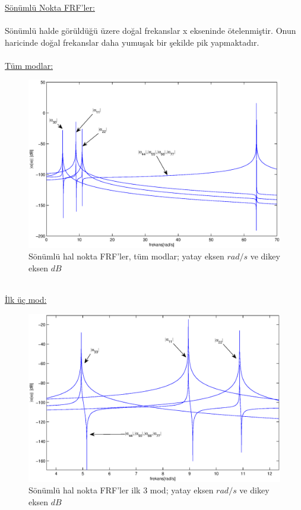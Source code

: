 \documentclass[a4paper]{report}
\begin{document}
~\\
~\\\clearpage
~\\
\underline{Sönümlü Nokta FRF'ler:}\\
~\\
Sönümlü halde görüldüğü üzere doğal frekanslar x ekseninde ötelenmiştir. Onun haricinde doğal frekanslar daha yumuşak bir şekilde pik yapmaktadır. \\~\\
\underline{Tüm modlar:}\\
\begin{figure}[H]\shorthandoff{=}
\centerline{
{\includegraphics[width=1.3\textwidth]{./noktaFRFs.eps}}}
\caption[Sönümsüz hal nokta FRF'ler]{Sönümlü hal nokta FRF'ler, tüm modlar; yatay eksen ${rad}/{s}$ ve dikey eksen $dB$ }
\label{fig:noktaFRFs}
\end{figure}\clearpage~\\
\underline{İlk üç mod:}\\
\begin{figure}[H]
\shorthandoff{=}
\centerline{
{\includegraphics[width=1.3\textwidth]{./noktaFRFsmod1-3.eps}}}
\caption[Sönümsüz hal nokta FRF'ler]{Sönümlü hal nokta FRF'ler ilk 3 mod; yatay eksen ${rad}/{s}$ ve dikey eksen $dB$ }
\label{fig:noktaFRFs1-3}
\end{figure}
\end{document}
